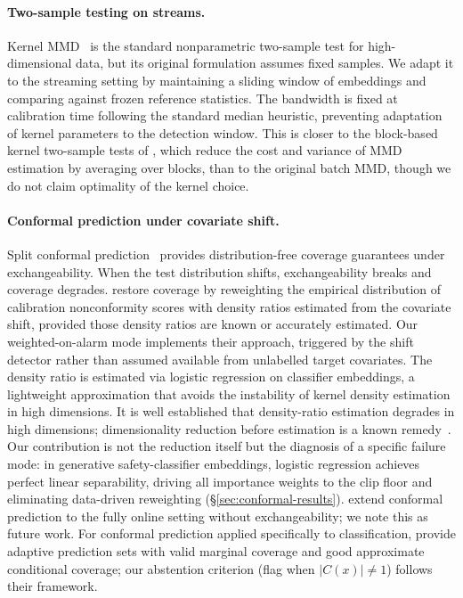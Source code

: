 \documentclass{article}
\begin{document}
\paragraph{Two-sample testing on streams.} Kernel MMD~\citep{gretton2012kernel} is the standard nonparametric two-sample test for high-dimensional data, but its original formulation assumes fixed samples. We adapt it to the streaming setting by maintaining a sliding window of embeddings and comparing against frozen reference statistics. The bandwidth is fixed at calibration time following the standard median heuristic, preventing adaptation of kernel parameters to the detection window. This is closer to the block-based kernel two-sample tests of \citet{zaremba2013btests}, which reduce the cost and variance of MMD estimation by averaging over blocks, than to the original batch MMD, though we do not claim optimality of the kernel choice.

\paragraph{Conformal prediction under covariate shift.} Split conformal prediction~\citep{vovk2005algorithmic} provides distribution-free coverage guarantees under exchangeability. When the test distribution shifts, exchangeability breaks and coverage degrades. \citet{tibshirani2019conformal} restore coverage by reweighting the empirical distribution of calibration nonconformity scores with density ratios estimated from the covariate shift, provided those density ratios are known or accurately estimated. Our weighted-on-alarm mode implements their approach, triggered by the shift detector rather than assumed available from unlabelled target covariates. The density ratio is estimated via logistic regression on classifier embeddings, a lightweight approximation that avoids the instability of kernel density estimation in high dimensions. It is well established that density-ratio estimation degrades in high dimensions; dimensionality reduction before estimation is a known remedy~\citep{stojanov2019lowdim,sugiyama2011direct}. Our contribution is not the reduction itself but the diagnosis of a specific failure mode: in generative safety-classifier embeddings, logistic regression achieves perfect linear separability, driving all importance weights to the clip floor and eliminating data-driven reweighting (\S\ref{sec:conformal-results}). \citet{gibbs2021adaptive} extend conformal prediction to the fully online setting without exchangeability; we note this as future work. For conformal prediction applied specifically to classification, \citet{romano2020classification} provide adaptive prediction sets with valid marginal coverage and good approximate conditional coverage; our abstention criterion (flag when $|C(x)| \neq 1$) follows their framework.
\end{document}
